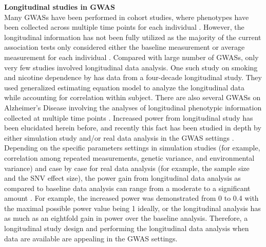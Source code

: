 \documentclass[12pt]{article}
\begin{document}
%


\textbf{Longitudinal studies in GWAS}\\
Many GWASs have been performed in cohort studies, where phenotypes have been collected across multiple time points for each individual \cite{Aulchenko2009,Ionita-Laza2007,Kamatani2010,Kathiresan2007,Sabatti2008}. However, the longitudinal information has not been fully utilized as the majority of the current association tests only considered either the baseline measurement or average measurement for each individual \cite{Sabatti2008,Ionita-Laza2007,Kamatani2010,Kathiresan2007}. Compared with large number of GWASs, only very few studies involved longitudinal data analysis. One such study on smoking and nicotine dependence by \cite{Belsky2013} has data from a four-decade longitudinal study. They used generalized estimating equation model to analyze the longitudinal data while accounting for correlation within subject. There are also several GWASs on Alzheimer's Disease involving the analyses of longitudinal phenotypic information collected at multiple time points \cite{Wang2012,Melville2012,Silver2012}. Increased power from longitudinal study has been elucidated herein before, and recently this fact has been studied in depth by either simulation study and/or real data analysis in the GWAS settings \cite{Xu2014,Furlotte2012}. Depending on the specific parameters settings in simulation studies (for example, correlation among repeated measurements, genetic variance, and environmental variance) and case by case for real data analysis (for example, the sample size and the SNV effect size), the power gain from longitudinal data analysis as compared to baseline data analysis can range from a moderate to a significant amount \cite{Xu2014,Furlotte2012}. For example, the increased power was demonstrated from 0 to 0.4 with the maximal possible power value being 1 ideally, or the longitudinal analysis has as much as an eightfold gain in power over the baseline analysis. Therefore, a longitudinal study design and performing the longitudinal data analysis when data are available are appealing in the GWAS settings.
\end{document}
